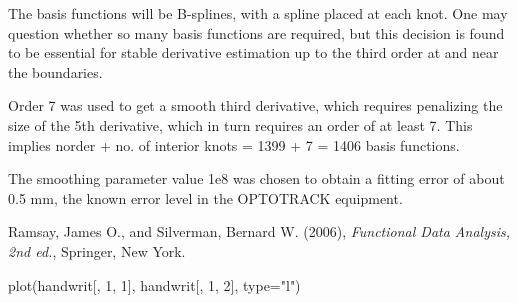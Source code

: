 \begin{Details}
The basis functions will be B-splines, with a spline placed at each
knot.  One may question whether so many basis functions are required,
but this decision is found to be essential for stable derivative
estimation up to the third order at and near the boundaries.  

Order 7 was used to get a smooth third derivative, which requires
penalizing the size of the 5th derivative, which in turn requires an
order of at least 7.  This implies norder + no. of interior knots =
1399 + 7 = 1406 basis functions.  

The smoothing parameter value 1e8 was chosen to obtain a fitting error
of about 0.5 mm, the known error level in the OPTOTRACK equipment.
\end{Details}
\begin{Source}\relax
Ramsay, James O., and Silverman, Bernard W. (2006), \emph{Functional
Data Analysis, 2nd ed.}, Springer, New York.
\end{Source}
\begin{Examples}
\begin{ExampleCode}
plot(handwrit[, 1, 1], handwrit[, 1, 2], type="l")
\end{ExampleCode}
\end{Examples}

